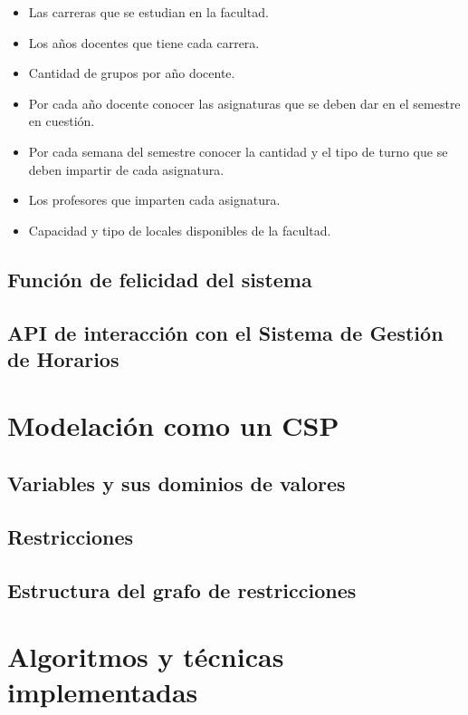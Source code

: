 \begin{itemize}

\item Las carreras que se estudian en la facultad.
\item Los años docentes que tiene cada carrera.
\item Cantidad de grupos por año docente.
\item Por cada año docente conocer las asignaturas que se deben dar en el semestre en cuesti\'on.
\item Por cada semana del semestre conocer la cantidad y el tipo de turno que se deben impartir de cada asignatura.
\item Los profesores que imparten cada asignatura.
\item Capacidad y tipo de locales disponibles de la facultad.

\end{itemize}

\subsection{Funci\'on de felicidad del sistema}

\subsection{API de interacci\'on con el Sistema de Gesti\'on de Horarios}

\section{Modelaci\'on como un CSP}

\subsection{Variables y sus dominios de valores}

\subsection{Restricciones}

\subsection{Estructura del grafo de restricciones}

\section{Algoritmos y t\'ecnicas implementadas}

